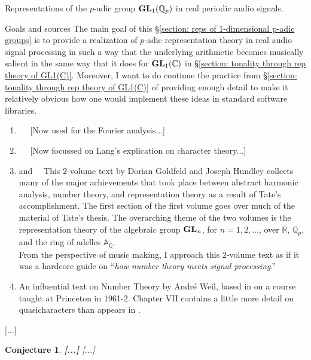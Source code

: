 \documentclass[letterpaper,11pt, reqno]{amsart}
\newtheorem{monodromy theorem}{Monodromy Theorem}[subsection]
\newtheorem{wild conjecture}[theorem]{Wild Conjecture}
\newtheorem{research objectives}{Research objectives}[subsection]
\newtheorem{research question}[theorem]{Research questions}
\newtheorem{aside question}[theorem]{Aside question}
\newtheorem{conjecture}[theorem]{Conjecture}
\newtheorem{audio example}[theorem]{\loudspeaker[3] Example}
\newtheorem{blank remark}[theorem]{}
\newtheorem{terminology and comment}[theorem]{Terminology and comment}
\newtheorem{purity hypothesis}[theorem]{Purity hypothesis}
\newtheorem{corollary of the purity hypothesis}[theorem]{Corollary of the purity hypothesis}
\newcommand{\CC} {{\mathbb C}}
\newcommand{\QQ} {{\mathbb Q}}
\newcommand{\RR} {{\mathbb R}}
\numberwithin{equation}{theorem}
\begin{document}
\begin{section}{Representations of the $p$-adic group $\bold{GL}_{1}(\mathbb{Q}_{p})$
in real periodic audio signals.}

\begin{subsection}{Goals and sources}
	The main goal of this \S\ref{section: reps of 1-dimensional p-adic groups} is to provide a realization of $p$-adic representation theory in real audio signal processing in such a way that the underlying arithmetic becomes musically salient in the same way that it does for $\bold{GL}_{1}(\CC)$ in \S\ref{section: tonality through rep theory of GL1(C)}. Moreover, I want to do continue the practice from \S\ref{section: tonality through rep theory of GL1(C)} of providing enough detail to make it relatively obvious how one would implement these ideas in standard software libraries.
	\begin{enumerate}[{\bf\ \ \ \ \ \ 1.}]
	\item
	\cite[Chp. XV: {\em J. T. Tate's thesis}, 1950]{CF}\ \textemdash\ {\color{red} [Now used for the Fourier analysis...]}
	\item
	\cite[\S VII.2]{Lang}\ \textemdash\ {\color{red} [Now focussed on Lang's explication on character theory...]}
	\item
	\cite[\S 1]{GHv1} and \cite{GHv2}\ \textemdash\ This $2$-volume text by Dorian Goldfeld and Joseph Hundley collects many of the major achievements that took place between abstract harmonic analysis, number theory, and representation theory as a result of Tate's accomplishment. The first section of  the first volume goes over much of the material of Tate's thesis. The overarching theme of the two volumes is the representation theory of the algebraic group $\bold{GL}_{n}$, for $n=1,2,\dots$, over $\RR$, $\QQ_{p}$, and the ring of adelles $\mathbb{A}_{\QQ}$.\\ 
	\indent
	From the perspective of music making, I approach this $2$-volume text as if it was a hardcore guide on ``{\em how number theory meets signal processing}.''
	\item
	\cite[Chp. VII]{Weil} An influential text on Number Theory by Andr\'e Weil, based in on a course taught at Princeton in 1961-2. Chapter VII contains a little more detail on quasicharacters than appears in \cite{Lang}.
\end{enumerate}
{\color{red} [...]}
	
	\begin{conjecture}
	{\bf {\color{red} [...]}}
	\normalfont
	{\color{red} [...]}
	\end{conjecture}
 

\end{subsection}
\end{section}
\end{document}
